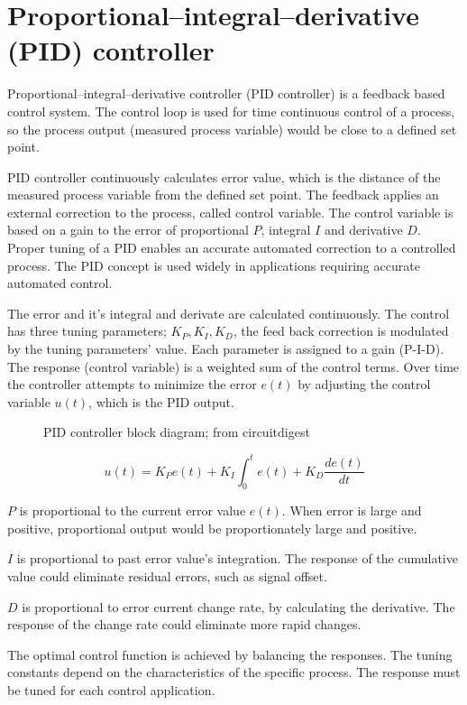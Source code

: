 \documentclass[\main/master.tex]{subfiles}
\begin{document}
\section{Proportional–integral–derivative (PID) controller}
Proportional–integral–derivative controller (PID controller) is a feedback based control system. The control loop is used for time continuous control of a process, so the process output (measured process variable) would be close to a defined set point.
\par\noindent
PID controller continuously calculates error value, which is the distance of the measured process variable from the defined set point. The feedback applies an external correction to the process, called control variable. The control variable is based on a gain to the error of proportional $P$, integral $I$ and derivative $D$. Proper tuning of a PID enables an accurate automated correction to a controlled process. The PID concept is used widely in applications requiring accurate automated control.

\par\noindent
The error and it's integral and derivate are calculated continuously. The control has three tuning parameters; $K_P, K_I, K_D$, the feed back correction is modulated by the tuning parameters' value. Each parameter is assigned to a gain (P-I-D). The response (control variable) is a weighted sum of the control terms. Over time the controller attempts to minimize the error $e(t)$ by adjusting the control variable $u(t)$, which is the PID output.
\par\noindent
\begin{figure}[htbp]
	\centering
	\caption[PID controller block diagram]{PID controller block diagram; from circuitdigest \cite{PID-diagram}}
	\label{fig:PID_scheme}
\end{figure}
\begin{equation}
u(t) = K_P e(t)+K_I\int_{0}^{t}e(t)+K_D\frac{de(t)}{dt}   \label{eqn:PID_eqn}
\end{equation}

\noindent
$P$ is proportional to the current error value $e(t)$. When error is large and positive, proportional output would be proportionately large and positive.
\par\noindent
$I$ is proportional to past error value's integration. The response of the cumulative value could eliminate residual errors, such as signal offset.
\par\noindent
$D$ is proportional to error current change rate, by calculating the derivative. The response of the change rate could eliminate more rapid changes.
\par\noindent
The optimal control function is achieved by balancing the responses. The tuning constants depend on the characteristics of the specific process. The response must be tuned for each control application.  
\end{document}
